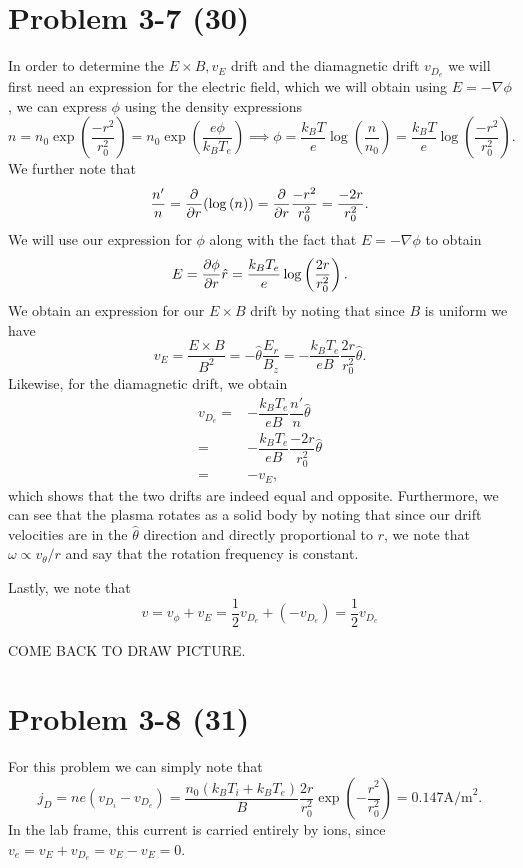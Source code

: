 \section*{Problem 3-7 (30)}
\label{sec:3-7}
In order to determine the \(E\times B, v_E \) drift and the diamagnetic drift \(v_{D_e}\) we will first need an expression for the electric field, which we will obtain using \(E = -\nabla \phi \), we can express \(\phi\) using the density expressions
\begin{equation*}
	n = n_0\exp\left(\frac{-r^2}{r_0^2} \right) = n_0\exp\left(\frac{e\phi}{k_BT_e} \right) \implies \phi = \dfrac{k_BT}{e}\log\left(\dfrac{n}{n_0}\right) = \dfrac{k_BT}{e}\log\left(\dfrac{-r^2}{r^2_0}\right).
\end{equation*}
We further note that
\begin{equation*}
	\dfrac{n'}{n} = \frac{\partial }{\partial r}(\log\left(n\right)) = \frac{\partial }{\partial r}\dfrac{-r^2}{r_0^2} = \dfrac{-2r}{r^2_0}.
\end{equation*}
We will use our expression for \(\phi\) along with the fact that \(E = -\nabla \phi \) to obtain
\begin{equation*}
	E = \frac{\partial \phi}{\partial r}\hat{r} = \dfrac{k_BT_e}{e}\log\left(\dfrac{2r}{r_0^2}\right).
\end{equation*}
We obtain an expression for our \(E\times B\) drift by noting that since \(B\) is uniform we have
\begin{equation*}
	v_E = \dfrac{E\times B}{B^2} = -\hat{\theta}\dfrac{E_r}{B_z} = -\dfrac{k_BT_e}{eB}\dfrac{2r}{r^2_0} \hat{\theta}.
\end{equation*}
Likewise, for the diamagnetic drift, we obtain
\begin{align*}
	v_{D_e} =& -\dfrac{k_BT_e}{eB}\dfrac{n'}{n}\hat{\theta}\\
	=& -\dfrac{k_BT_e}{eB}\dfrac{-2r}{r_0^2}\hat{\theta}\\
	=& -v_E,
\end{align*}
which shows that the two drifts are indeed equal and opposite. Furthermore, we can see that the plasma rotates as a solid body by noting that since our drift velocities are in the \(\hat{\theta} \) direction and directly proportional to \(r\), we note that \(\omega \propto v_\theta/r \) and say that the rotation frequency is constant.

Lastly, we note that 
\begin{equation*}
	v = v_\phi + v_E = \frac{1}{2}v_{D_e} + (-v_{D_e}) = \frac{1}{2}v_{D_e}
\end{equation*}

COME BACK TO DRAW PICTURE.

\section*{Problem 3-8 (31)}
\label{sec:3-8}
For this problem we can simply note that 
\begin{equation*}
	j_D = ne\left(v_{D_i} - v_{D_e}\right) = \dfrac{n_0(k_BT_i + k_BT_e)}{B}\dfrac{2r}{r^2_0}\exp\left(-\dfrac{r^2}{r^2_0} \right) = 0.147 \text{A/m}^2.
\end{equation*}
In the lab frame, this current is carried entirely by ions, since \(v_e = v_E + v_{D_e} = v_E - v_E = 0 \).




